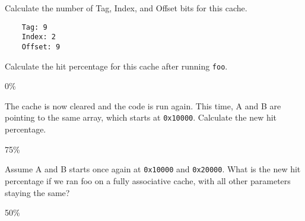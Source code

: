 \begin{blocksection}
\question
Calculate the number of Tag, Index, and Offset bits for this cache.
\begin{solution}
    \begin{verbatim}
    Tag: 9
    Index: 2
    Offset: 9
    \end{verbatim}
\end{solution}


\question
Calculate the hit percentage for this cache after running \lstinline$foo$.
\begin{solution}
0\%
\end{solution}


\question
The cache is now cleared and the code is run again. This time, A and B are pointing to the same array, which starts at \lstinline$0x10000$. Calculate the new hit percentage.
\begin{solution}
75\%
\end{solution}


\question
Assume A and B starts once again at \lstinline$0x10000$ and \lstinline$0x20000$. What is the new hit percentage if we ran foo on a fully associative cache, with all other parameters staying the same?
\begin{solution}
50\%
\end{solution}

\end{blocksection}